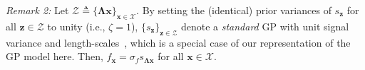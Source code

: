 \documentclass[conference]{IEEEtran}
\begin{document}



\emph{Remark 2:} Let $\mathcal{Z}\triangleq\{\mathbf{\Lambda}\mathbf{x}\}_{\mathbf{x} \in \mathcal{X}}$.
By setting the (identical) prior variances of $s_\mathbf{z}$ for all $\mathbf{z}\in\mathcal{Z}$ to unity
(i.e., $\zeta = 1$), $\{s_\mathbf{z}\}_{\mathbf{z}\in\mathcal{Z}}$ denote a \emph{standard} GP with unit signal variance and length-scales~\cite{Titsias13},
which is a special case of our representation of the GP model here.
Then, $f_\mathbf{x} = \sigma_f s_{\mathbf{\Lambda x}}$ for all $\mathbf{x} \in \mathcal{X}$.
%
%
%
\end{document}
